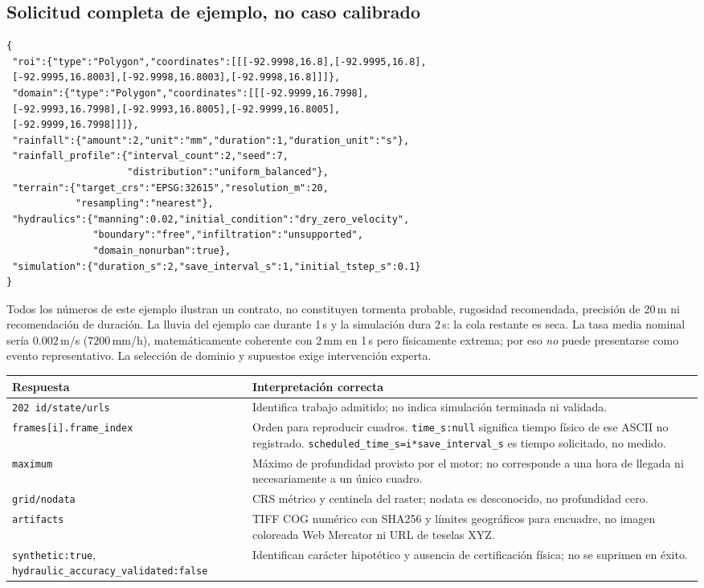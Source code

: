 \documentclass[11pt,a4paper]{article}
\newcommand{\src}[1]{\nolinkurl{#1}}
\begin{document}
\subsection{Solicitud completa de ejemplo, no caso calibrado}
{\small\begin{verbatim}
{
 "roi":{"type":"Polygon","coordinates":[[[-92.9998,16.8],[-92.9995,16.8],
 [-92.9995,16.8003],[-92.9998,16.8003],[-92.9998,16.8]]]},
 "domain":{"type":"Polygon","coordinates":[[[-92.9999,16.7998],
 [-92.9993,16.7998],[-92.9993,16.8005],[-92.9999,16.8005],
 [-92.9999,16.7998]]]},
 "rainfall":{"amount":2,"unit":"mm","duration":1,"duration_unit":"s"},
 "rainfall_profile":{"interval_count":2,"seed":7,
                     "distribution":"uniform_balanced"},
 "terrain":{"target_crs":"EPSG:32615","resolution_m":20,
            "resampling":"nearest"},
 "hydraulics":{"manning":0.02,"initial_condition":"dry_zero_velocity",
               "boundary":"free","infiltration":"unsupported",
               "domain_nonurban":true},
 "simulation":{"duration_s":2,"save_interval_s":1,"initial_tstep_s":0.1}
}
\end{verbatim}}
Todos los números de este ejemplo ilustran un contrato, no constituyen tormenta probable, rugosidad recomendada, precisión de 20\,m ni recomendación de duración. La lluvia del ejemplo cae durante 1\,s y la simulación dura 2\,s: la cola restante es seca. La tasa media nominal sería $0.002$\,m/s ($7200$\,mm/h), matemáticamente coherente con 2\,mm en 1\,s pero físicamente extrema; por eso \emph{no} puede presentarse como evento representativo. La selección de dominio y supuestos exige intervención experta.

\noindent\begin{tabularx}{\linewidth}{p{.23\linewidth}X}
\toprule Respuesta & Interpretación correcta\\\midrule
\texttt{202 id/state/urls} & Identifica trabajo admitido; no indica simulación terminada ni validada.\\
\src{frames[i].frame_index} & Orden para reproducir cuadros. \texttt{time\_s:null} significa tiempo físico de ese ASCII no registrado. \texttt{scheduled\_time\_s=i*save\_interval\_s} es tiempo solicitado, no medido.\\
\texttt{maximum} & Máximo de profundidad provisto por el motor; no corresponde a una hora de llegada ni necesariamente a un único cuadro.\\
\texttt{grid/nodata} & CRS métrico y centinela del raster; nodata es desconocido, no profundidad cero.\\
\texttt{artifacts} & TIFF COG numérico con SHA256 y límites geográficos para encuadre, no imagen coloreada Web Mercator ni URL de teselas XYZ.\\
\src{synthetic:true}, \src{hydraulic_accuracy_validated:false} & Identifican carácter hipotético y ausencia de certificación física; no se suprimen en éxito.\\\bottomrule
\end{tabularx}
\end{document}
